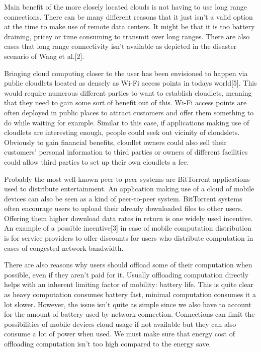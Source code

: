 \documentclass[conference]{IEEEtran}
\begin{document}
\par
Main benefit of the more closely located clouds is not having to use long range connections. There can be many different reasons that it just isn't a valid option at the time to make use of remote data centers. It might be that it is too battery draining, pricey or time consuming to transmit over long ranges. There are also cases that long range connectivity isn't available as depicted in the disaster scenario of Wang et al.[2].
\par
Bringing cloud computing closer to the user has been envisioned to happen via public cloudlets located as densely as Wi-Fi access points in todays world[5]. This would require numerous different parties to want to establish cloudlets, meaning that they need to gain some sort of benefit out of this. Wi-Fi access points are often deployed in public places to attract customers and offer them something to do while waiting for example. Similar to this case, if applications making use of cloudlets are interesting enough, people could seek out vicinity of cloudslets. Obviously to gain financial benefits, cloudlet owners could also sell their customers' personal information to third parties or owners of different facilities could allow third parties to set up their own cloudlets a fee.
\par
Probably the most well known peer-to-peer systems are BitTorrent applications used to distribute entertainment. An application making use of a cloud of mobile devices can also be seen as a kind of peer-to-peer system. BitTorrent systems often encourage users to upload their already downloaded files to other users. Offering them higher download data rates in return is one widely used incentive. An example of a possible incentive[3] in case of mobile computation distribution is for service providers to offer discounts for users who distribute computation in cases of congested network bandwidth.
\par
There are also reasons why users should offload some of their computation when possible, even if they aren't paid for it. Usually offloading computation directly helps with an inherent limiting factor of mobility: battery life. This is quite clear as heavy computation consumes battery fast, minimal computation consumes it a lot slower. However, the issue isn't quite as simple since we also have to account for the amount of battery used by network connection. Connections can limit the possibilities of mobile devices cloud usage if not available but they can also consume a lot of power when used. We must make sure that energy cost of offloading computation isn't too high compared to the energy save.
\end{document}
